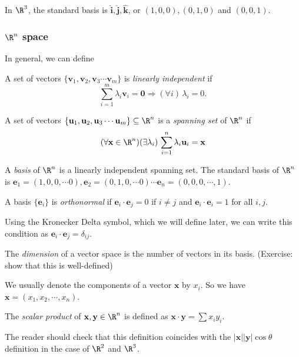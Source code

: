 \documentclass[a4paper]{article}
\begin{document}
In $\R^3$, the standard basis is $\mathbf{\hat{i}, \hat{j}, \hat{k}}$, or $(1, 0, 0), (0, 1, 0)$ and $(0, 0, 1)$.
\subsubsection{\texorpdfstring{$\R^n$}{Rn} space}
In general, we can define
\begin{defi}
  A set of vectors $\{\mathbf{v}_1, \mathbf{v}_2, \mathbf{v}_3\cdots \mathbf{v}_m\}$ is \emph{linearly independent} if
  \[
    \sum_{i = 1}^m\lambda_i\mathbf{v}_i = \mathbf{0} \Rightarrow (\forall i)\,\lambda_i = 0.
  \]
\end{defi}
\begin{defi}
  A set of vectors $\{\mathbf{u}_1, \mathbf{u}_2, \mathbf{u}_3\cdots \mathbf{u}_m\}\subseteq \R^n$ is a \emph{spanning set} of $\R^n$ if
  \[
    (\forall \mathbf{x} \in \R^n)(\exists \lambda_i)\,\sum_{i = 1}^n\lambda_i\mathbf{u}_i = \mathbf{x}
  \]
\end{defi}

\begin{defi}
  A \emph{basis} of $\R^n$ is a linearly independent spanning set. The standard basis of $\R^n$ is $\mathbf{e}_1 = (1, 0, 0, \cdots 0), \mathbf{e}_2 = (0, 1, 0, \cdots 0)\cdots \mathbf{e}_n = (0, 0, 0, \cdots, 1)$.
\end{defi}

\begin{defi}
  A basis $\{\mathbf{e}_i\}$ is \emph{orthonormal} if $\mathbf{e}_i\cdot \mathbf{e}_j = 0$ if $i\not= j$ and $\mathbf{e}_i\cdot \mathbf{e}_i = 1$ for all $i, j$.

  Using the Kronecker Delta symbol, which we will define later, we can write this condition as $\mathbf{e}_i \cdot \mathbf{e}_j = \delta_{ij}$.
\end{defi}

\begin{defi}
  The \emph{dimension} of a vector space is the number of vectors in its basis. (Exercise: show that this is well-defined)
\end{defi}
We usually denote the components of a vector $\mathbf{x}$ by $x_i$. So we have $\mathbf{x} = (x_1, x_2, \cdots, x_n)$.

\begin{defi}
  The \emph{scalar product} of $\mathbf{x, y}\in \R^n$ is defined as $\mathbf{x\cdot y} = \sum x_i y_i$.
\end{defi}
The reader should check that this definition coincides with the $|\mathbf{x}||\mathbf{y}|\cos\theta$ definition in the case of $\R^2$ and $\R^3$.
\end{document}
